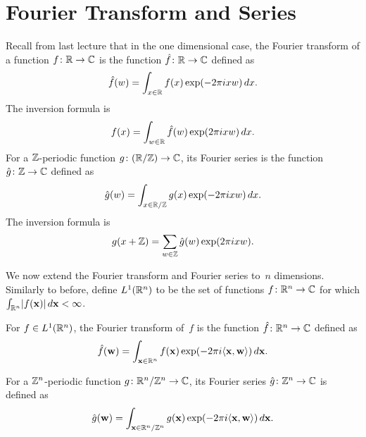 \documentclass[11pt]{article}
\begin{document}
\thispagestyle{fancy} %


\section{Fourier Transform and Series}

Recall from last lecture that in the one dimensional case, the Fourier
transform of a function $f \colon \mathbb{R} \to \mathbb{C}$ is the function
$\hat{f} \colon \mathbb{R} \to \mathbb{C}$ defined as
\[ \hat{f}(w) = \int_{x\in \mathbb{R}} f(x) \exp(-2 \pi ixw) \, dx . \] The
inversion formula is
\[ f(x) = \int_{w\in \mathbb{R}} \hat{f}(w) \exp(2 \pi ixw) \, dx. \] For a
$\mathbb{Z}$-periodic function $g \colon (\mathbb{R} / \mathbb{Z}) \to \mathbb{C}$, its Fourier series
is the function $\hat{g} \colon \mathbb{Z} \to \mathbb{C}$ defined as
\[ \hat{g}(w) = \int_{x \in \mathbb{R}/\mathbb{Z}} g(x) \exp(-2 \pi ixw) \, dx . \] The
inversion formula is
\[ g(x+\mathbb{Z}) = \sum_{w \in \mathbb{Z}} \hat{g}(w) \exp(2 \pi ixw). \]

We now extend the Fourier transform and Fourier series to~$n$
dimensions. Similarly to before, define $L^{1}(\mathbb{R}^n)$ to be the set of
functions $f \colon \mathbb{R}^n \to \mathbb{C}$ for which
$\int_{\mathbb{R}^n} \lvert f(\mathbf{x})\rvert \, d\mathbf{x} < \infty$.

\begin{definition}
  \label{def:fourier-transform}
  For $f \in L^{1}(\mathbb{R}^n)$, the Fourier transform of~$f$ is the
  function $\hat{f} \colon \mathbb{R}^{n} \to \mathbb{C}$ defined as
  \[ \hat{f}(\mathbf{w}) = \int_{\mathbf{x}\in \mathbb{R}^n} f(\mathbf{x})\exp(-2 \pi i
    \langle\mathbf{x},\mathbf{w}\rangle) \, d\mathbf{x} . \]
\end{definition}

\begin{definition}
  For a $\mathbb{Z}^{n}$-periodic function $g \colon \mathbb{R}^{n}/\mathbb{Z}^{n} \to \mathbb{C}$,
  its Fourier series $\hat{g} \colon \mathbb{Z}^{n} \to \mathbb{C}$ is defined as
  \[ \hat{g}(\mathbf{w}) = \int_{\mathbf{x}\in \mathbb{R}^n / \mathbb{Z}^n} g(\mathbf{x}) \exp(-2 \pi
    i\langle\mathbf{x},\mathbf{w}\rangle) \, d\mathbf{x} . \]
\end{definition}
\end{document}
